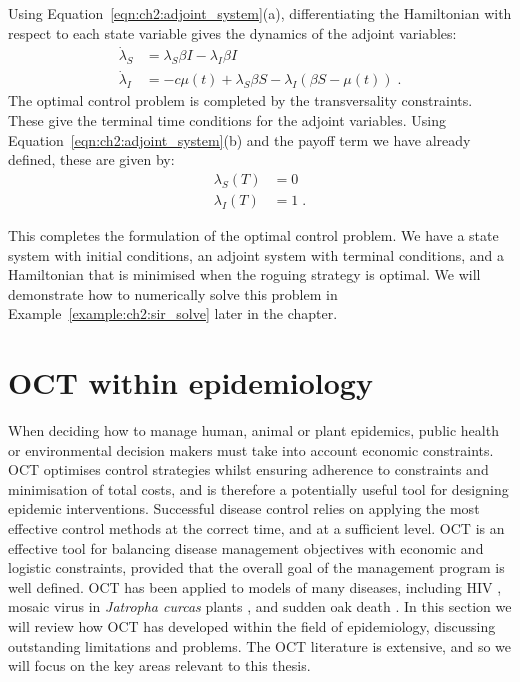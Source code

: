 \begin{example}
    Using Equation~\ref{eqn:ch2:adjoint_system}(a), differentiating the Hamiltonian with respect to each state variable gives the dynamics of the adjoint variables:
    \begin{subequations}
        \begin{align}
            \dot{\lambda}_S &= \lambda_S\beta{}I - \lambda_I\beta{}I\\
            \dot{\lambda}_I &= -c\mu(t) + \lambda_S\beta{}S - \lambda_I\left(\beta{}S - \mu(t)\right)\;.
        \end{align}
    \end{subequations}
    The optimal control problem is completed by the transversality constraints. These give the terminal time conditions for the adjoint variables. Using Equation~\ref{eqn:ch2:adjoint_system}(b) and the payoff term we have already defined, these are given by:
    \begin{subequations}
        \begin{align}
            \lambda_S(T) &= 0\\
            \lambda_I(T) &= 1\;.
        \end{align}
    \end{subequations}

    This completes the formulation of the optimal control problem. We have a state system with initial conditions, an adjoint system with terminal conditions, and a Hamiltonian that is minimised when the roguing strategy is optimal. We will demonstrate how to numerically solve this problem in Example~\ref{example:ch2:sir_solve} later in the chapter.
\end{example}

\section{OCT within epidemiology}\label{sec:ch2:oct_in_epidem}

When deciding how to manage human, animal or plant epidemics, public health or environmental decision makers must take into account economic constraints. OCT optimises control strategies whilst ensuring adherence to constraints and minimisation of total costs, and is therefore a potentially useful tool for designing epidemic interventions. Successful disease control relies on applying the most effective control methods at the correct time, and at a sufficient level. OCT is an effective tool for balancing disease management objectives with economic and logistic constraints, provided that the overall goal of the management program is well defined. OCT has been applied to models of many diseases, including HIV \citep{kirschner_optimal_1997}, mosaic virus in \emph{Jatropha curcas} plants \citep{al_basir_impact_2017}, and sudden oak death \citep{ndeffo_mbah_optimization_2010}. In this section we will review how OCT has developed within the field of epidemiology, discussing outstanding limitations and problems. The OCT literature is extensive, and so we will focus on the key areas relevant to this thesis.

